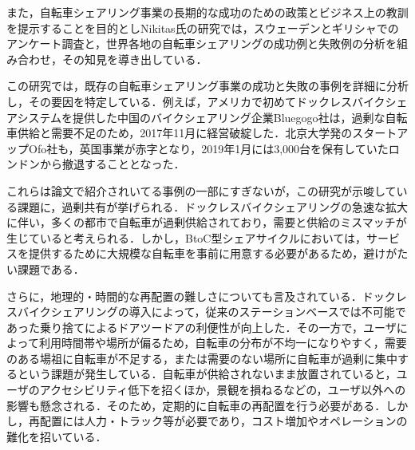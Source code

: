           \par また，自転車シェアリング事業の長期的な成功のための政策とビジネス上の教訓を提示することを目的としNikitas氏の研究では，スウェーデンとギリシャでのアンケート調査と，世界各地の自転車シェアリングの成功例と失敗例の分析を組み合わせ，その知見を導き出している．
          \par この研究では，既存の自転車シェアリング事業の成功と失敗の事例を詳細に分析し，その要因を特定している．例えば，アメリカで初めてドックレスバイクシェアシステムを提供した中国のバイクシェアリング企業Bluegogo社は，過剰な自転車供給と需要不足のため，2017年11月に経営破綻した．北京大学発のスタートアップOfo社も，英国事業が赤字となり，2019年1月には3,000台を保有していたロンドンから撤退することとなった．
          \par これらは論文で紹介されいてる事例の一部にすぎないが，この研究が示唆している課題に，過剰共有が挙げられる．ドックレスバイクシェアリングの急速な拡大に伴い，多くの都市で自転車が過剰供給されており，需要と供給のミスマッチが生じていると考えられる．しかし，BtoC型シェアサイクルにおいては，サービスを提供するために大規模な自転車を事前に用意する必要があるため，避けがたい課題である．
          \par さらに，地理的・時間的な再配置の難しさについても言及されている．ドックレスバイクシェアリングの導入によって，従来のステーションベースでは不可能であった乗り捨てによるドアツードアの利便性が向上した．その一方で，ユーザによって利用時間帯や場所が偏るため，自転車の分布が不均一になりやすく，需要のある場祖に自転車が不足する，または需要のない場所に自転車が過剰に集中するという課題が発生している．自転車が供給されないまま放置されていると，ユーザのアクセシビリティ低下を招くほか，景観を損ねるなどの，ユーザ以外への影響も懸念される．そのため，定期的に自転車の再配置を行う必要がある．しかし，再配置には人力・トラック等が必要であり，コスト増加やオペレーションの難化を招いている．


